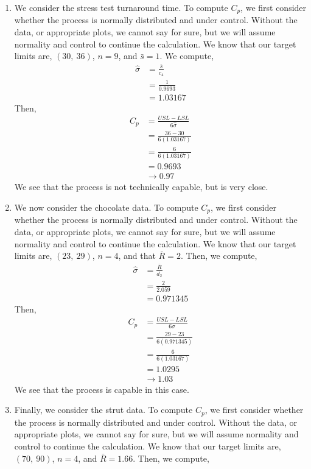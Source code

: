 \documentclass[letterpaper,10pt]{article}
\begin{document}
\begin{enumerate}
\item We consider the stress test turnaround time. To compute $C_p$, we first consider whether the process is normally distributed and under control. Without the data, or appropriate plots, we cannot say for sure, but we will assume normality and control to continue the calculation. We know that our target limits are, $(30,\ 36)$, $n=9$, and $\bar{s}=1$. We compute,
\begin{align*}
\hat{\sigma} &= \frac{\bar{s}}{c_4}\\
&=\frac{1}{0.9693}\\
&=1.03167
\end{align*}
Then,
\begin{align*}
C_p &= \frac{USL-LSL}{6\hat{\sigma}}\\
&=\frac{36-30}{6(1.03167)}\\
&=\frac{6}{6(1.03167)}\\
&=0.9693\\
&\to 0.97
\end{align*}
We see that the process is not technically capable, but is very close.
\item We now consider the chocolate data. To compute $C_p$, we first consider whether the process is normally distributed and under control. Without the data, or appropriate plots, we cannot say for sure, but we will assume normality and control to continue the calculation. We know that our target limits are, $(23,\ 29)$, $n=4$, and that $\bar{R}=2$. Then, we compute,
\begin{align*}
\hat{\sigma} &= \frac{\bar{R}}{d_2}\\
&=\frac{2}{2.059}\\
&=0.971345
\end{align*}
Then,
\begin{align*}
C_p &= \frac{USL-LSL}{6\hat{\sigma}}\\
&=\frac{29-23}{6(0.971345)}\\
&=\frac{6}{6(1.03167)}\\
&=1.0295\\
&\to 1.03
\end{align*}
We see that the process is capable in this case.
\item Finally, we consider the strut data. To compute $C_p$, we first consider whether the process is normally distributed and under control. Without the data, or appropriate plots, we cannot say for sure, but we will assume normality and control to continue the calculation. We know that our target limits are, $(70,\ 90)$, $n=4$, and $\bar{R}=1.66$. Then, we compute,

\end{enumerate}
\end{document}
